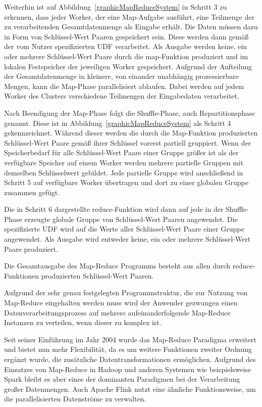 Weiterhin ist auf Abbildung~\ref{graphicMapReduceSystem} in Schritt 3 zu erkennen, dass jeder Worker, der eine Map-Aufgabe ausführt, eine Teilmenge der zu verarbeitenden Gesamtdatenmenge als Eingabe erhält. Die Daten müssen dazu in Form von Schlüssel-Wert Paaren gespeichert sein. Diese werden dann gemäß der vom Nutzer spezifizierten UDF verarbeitet. Als Ausgabe werden keine, ein oder mehrere Schlüssel-Wert Paare durch die map-Funktion produziert und im lokalen Festspeicher der jeweiligen Worker gespeichert. Aufgrund der Aufteilung der Gesamtdatenmenge in kleinere, von einander unabhängig prozessierbare Mengen, kann die Map-Phase parallelisiert ablaufen. Dabei werden auf jedem Worker des Clusters verschiedene Teilmengen der Eingabedaten verarbeitet. 

Nach Beendigung der Map-Phase folgt die Shuffle-Phase, auch Repartitionsphase genannt. Diese ist in Abbildung~\ref{graphicMapReduceSystem} als Schritt 4 gekennzeichnet. Während dieser werden die durch die Map-Funktion produzierten Schlüssel-Wert Paare gemäß ihrer Schlüssel vorerst partiell gruppiert. Wenn der Speicherbedarf für alle Schlüssel-Wert Paare einer Gruppe größer ist als der verfügbare Speicher auf einem Worker werden mehrere partielle Gruppen mit demselben Schlüsselwert gebildet. Jede partielle Gruppe wird anschließend in Schritt 5 auf verfügbare Worker übertragen und dort zu einer globalen Gruppe zusammen gefügt.

Die in Schritt 6 dargestellte reduce-Funktion wird dann auf jede in der Shuffle-Phase erzeugte globale Gruppe von Schlüssel-Wert Paaren angewendet. Die spezifizierte UDF wird auf die Werte aller Schlüssel-Wert Paare einer Gruppe angewendet. Als Ausgabe wird entweder keine, ein oder mehrere Schlüssel-Wert Paare produziert. 

Die Gesamtausgabe des Map-Reduce Programms besteht aus allen durch reduce-Funktionen produzierten Schlüssel-Wert Paaren.

Aufgrund der sehr genau festgelegten Programmstruktur, die zur Nutzung von Map-Reduce eingehalten werden muss wird der Anwender gezwungen einen Datenverarbeitungsprozess auf mehrere aufeinanderfolgende Map-Reduce Instanzen zu verteilen, wenn dieser zu komplex ist. 
 
Seit seiner Einführung im Jahr 2004 wurde das Map-Reduce Paradigma erweitert und bietet nun mehr Flexibilität, da es um weitere Funktionen zweiter Ordnung ergänzt wurde, die zusätzliche Datentransformationen ermöglichen. Aufgrund des Einsatzes von Map-Reduce in Hadoop \cite{HadoopWebsite} und anderen Systemen wie beispielsweise Spark \cite{Zaharia2010} bleibt es aber eines der dominanten Paradigmen bei der Verarbeitung großer Datenmengen. Auch Apache Flink \cite{FlinkWebsite} nutzt eine ähnliche Funktionsweise, um die parallelisierten Datenströme zu verwalten.

